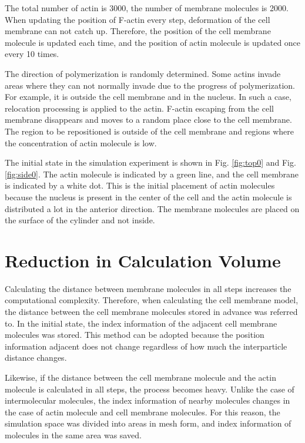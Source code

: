 \documentclass[a4paper,12pt]{book}
\begin{document}
The total number of actin is 3000, the number of membrane molecules is 2000. When updating the position of F-actin every step, deformation of the cell membrane can not catch up. Therefore, the position of the cell membrane molecule is updated each time, and the position of actin molecule is updated once every 10 times.

The direction of polymerization is randomly determined. Some actins invade areas where they can not normally invade due to the progress of polymerization. For example, it is outside the cell membrane and in the nucleus. In such a case, relocation processing is applied to the actin. F-actin escaping from the cell membrane disappears and moves to a random place close to the cell membrane. The region to be repositioned is outside of the cell membrane and regions where the concentration of actin molecule is low.

The initial state in the simulation experiment is shown in Fig. \ref{fig:top0} and Fig. \ref{fig:side0}. The actin molecule is indicated by a green line, and the cell membrane is indicated by a white dot. This is the initial placement of actin molecules because the nucleus is present in the center of the cell and the actin molecule is distributed a lot in the anterior direction. The membrane molecules are placed on the surface of the cylinder and not inside.

\section{Reduction in Calculation Volume}
Calculating the distance between membrane molecules in all steps increases the computational complexity.
Therefore, when calculating the cell membrane model, the distance between the cell membrane molecules stored in advance was referred to.
In the initial state, the index information of the adjacent cell membrane molecules was stored.
This method can be adopted because the position information adjacent does not change regardless of how much the interparticle distance changes.

Likewise, if the distance between the cell membrane molecule and the actin molecule is calculated in all steps, the process becomes heavy.
Unlike the case of intermolecular molecules, the index information of nearby molecules changes in the case of actin molecule and cell membrane molecules.
For this reason, the simulation space was divided into areas in mesh form, and index information of molecules in the same area was saved.
\end{document}
